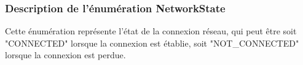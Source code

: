 \subsubsection{Description de l'énumération NetworkState}

Cette énumération représente l'état de la connexion réseau, qui peut être soit "CONNECTED" lorsque la connexion est établie, soit "NOT\_CONNECTED" lorsque la connexion est perdue.
\newline